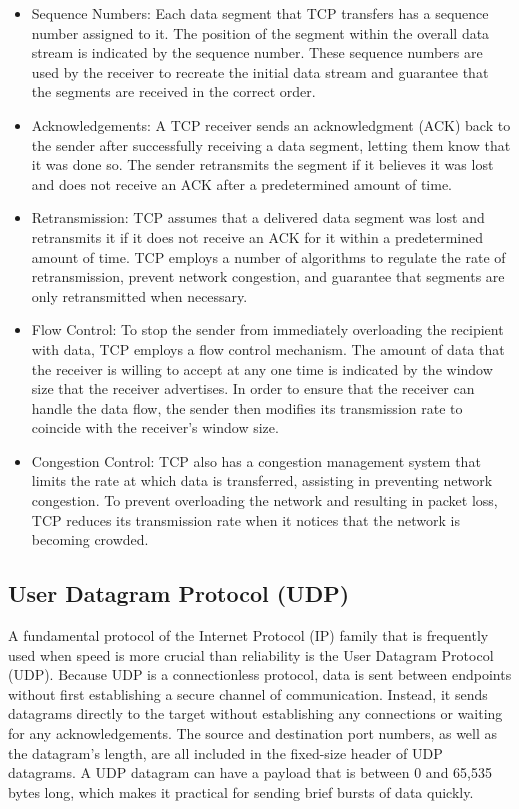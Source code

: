 \begin{itemize}
    \item Sequence Numbers: Each data segment that TCP transfers has a sequence number assigned to it. The position of the segment within the overall data stream is indicated by the sequence number. These sequence numbers are used by the receiver to recreate the initial data stream and guarantee that the segments are received in the correct order.\cite{rfc793}
    \item Acknowledgements: A TCP receiver sends an acknowledgment (ACK) back to the sender after successfully receiving a data segment, letting them know that it was done so. The sender retransmits the segment if it believes it was lost and does not receive an ACK after a predetermined amount of time.\cite{rfc793}
    \item Retransmission: TCP assumes that a delivered data segment was lost and retransmits it if it does not receive an ACK for it within a predetermined amount of time. TCP employs a number of algorithms to regulate the rate of retransmission, prevent network congestion, and guarantee that segments are only retransmitted when necessary.\cite{rfc793}
    \item Flow Control: To stop the sender from immediately overloading the recipient with data, TCP employs a flow control mechanism. The amount of data that the receiver is willing to accept at any one time is indicated by the window size that the receiver advertises. In order to ensure that the receiver can handle the data flow, the sender then modifies its transmission rate to coincide with the receiver's window size.\cite{rfc5681}
    \item Congestion Control: TCP also has a congestion management system that limits the rate at which data is transferred, assisting in preventing network congestion. To prevent overloading the network and resulting in packet loss, TCP reduces its transmission rate when it notices that the network is becoming crowded.\cite{rfc5681}
\end{itemize}

\subsection{User Datagram Protocol (UDP)}
A fundamental protocol of the Internet Protocol (IP) family that is frequently used when speed is more crucial than reliability is the User Datagram Protocol (UDP). Because UDP is a connectionless protocol, data is sent between endpoints without first establishing a secure channel of communication. Instead, it sends datagrams directly to the target without establishing any connections or waiting for any acknowledgements.\cite{glazer2015multiplayer}
The source and destination port numbers, as well as the datagram's length, are all included in the fixed-size header of UDP datagrams. A UDP datagram can have a payload that is between 0 and 65,535 bytes long, which makes it practical for sending brief bursts of data quickly.\cite{fiedler2013networking}

